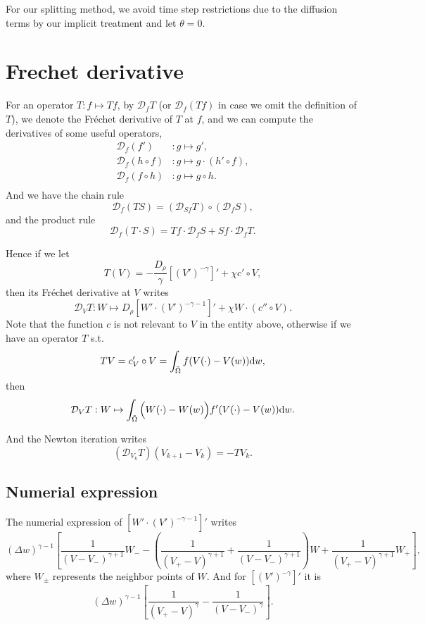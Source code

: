 \documentclass{article}
\newcommand{\frender}{\mathcal D}
\begin{document}
  For our splitting method, we avoid time step restrictions due to the diffusion terms by our
  implicit treatment and let $\theta = 0$.

  \section{Frechet derivative}
  For an operator $T: f\mapsto Tf$, by $\frender_fT$ (or $\frender_f(Tf)$ in case we omit the definition
  of $T$), we denote the Fr\'echet derivative
  of $T$ at $f$, and we can compute the derivatives of some useful operators,
  \[
    \begin{aligned}
      \frender_f(f')      &:g\mapsto g', \\
      \frender_f(h\circ f)&:g\mapsto g\cdot(h'\circ f), \\
      \frender_f(f\circ h)&:g\mapsto g\circ h. \\
    \end{aligned}
  \]
  And we have the chain rule
  \[
    \frender_f(TS) = \left(\frender_{Sf}T\right) \circ \left(\frender_fS\right),
  \]
  and the product rule
  \[
    \frender_f(T\cdot S) = Tf\cdot\frender_fS + Sf\cdot\frender_fT.
  \]

  Hence if we let
  \[
    T(V) = -\frac{D_\rho}{\gamma}\left[(V')^{-\gamma}\right]'
    + \chi c'\circ V,
  \]
  then its Fr\'echet derivative at $V$ writes
  \[
    \frender_V T: W\mapsto
    D_\rho\left[W'\cdot (V')^{-\gamma - 1}\right]' + \chi W\cdot(c''\circ V).
  \]
  Note that the function $c$ is not relevant to $V$ in the entity above,
  otherwise if we have an operator $T$ s.t.
  \[
    TV = c_V'\circ V = \int_{\tilde\Omega} f(V(\cdot) - V(w))\mathrm d w,
  \]
  then
  \[
    \frender_VT:W \mapsto \int_{\tilde\Omega}\Big(W(\cdot) - W(w)\Big)f'(V(\cdot) - V(w))\diff w.
  \]

  And the Newton iteration writes
  \[
    (\frender_{V_k} T)(V_{k + 1} - V_k) = - TV_k.
  \]

  \subsection{Numerial expression}
  The numerial expression of $[W'\cdot(V')^{-\gamma - 1}]'$ writes
  \[
    (\Delta w)^{\gamma - 1}
    \left[
      \frac{1}{(V - V_-)^{\gamma + 1}}W_-
      -\left(\frac{1}{(V_+ - V)^{\gamma + 1}} + \frac{1}{(V - V_-)^{\gamma + 1}}\right)W
      +\frac{1}{(V_+ - V)^{\gamma + 1}}W_+
    \right],
  \]
  where $W_{\pm}$ represents the neighbor points of $W$.
  And for $[(V')^{-\gamma}]'$ it is
  \[
    (\Delta w)^{\gamma - 1}
    \left[
      \frac1{(V_+ - V)^{\gamma}} - \frac1{(V - V_-)^\gamma}
    \right].
  \]
\end{document}
